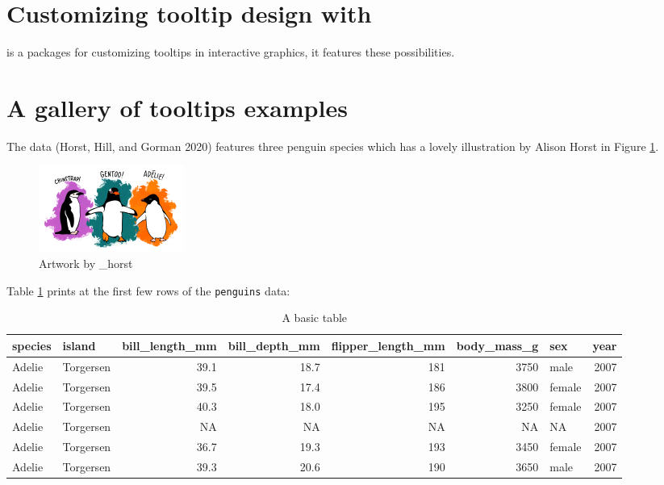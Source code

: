 \section{\texorpdfstring{Customizing tooltip design with }{Customizing tooltip design with }}\label{customizing-tooltip-design-with}

 is a packages for customizing tooltips in interactive graphics, it features these possibilities.

\section{A gallery of tooltips examples}\label{a-gallery-of-tooltips-examples}

The  data (Horst, Hill, and Gorman 2020) features three penguin species which has a lovely illustration by Alison Horst in Figure \ref{fig:penguins-alison}.

\begin{figure}
\includegraphics[width=1\linewidth,height=0.3\textheight]{figures/penguins} \caption{Artwork by \@allison\_horst}\label{fig:penguins-alison}
\end{figure}

Table \ref{tab:penguins-tab-static} prints at the first few rows of the \texttt{penguins} data:

\begin{table}
\centering
\caption{\label{tab:penguins-tab-static}A basic table}
\centering
\fontsize{7}{9}\selectfont
\begin{tabular}[t]{l|l|r|r|r|r|l|r}
\hline
species & island & bill\_length\_mm & bill\_depth\_mm & flipper\_length\_mm & body\_mass\_g & sex & year\\
\hline
Adelie & Torgersen & 39.1 & 18.7 & 181 & 3750 & male & 2007\\
\hline
Adelie & Torgersen & 39.5 & 17.4 & 186 & 3800 & female & 2007\\
\hline
Adelie & Torgersen & 40.3 & 18.0 & 195 & 3250 & female & 2007\\
\hline
Adelie & Torgersen & NA & NA & NA & NA & NA & 2007\\
\hline
Adelie & Torgersen & 36.7 & 19.3 & 193 & 3450 & female & 2007\\
\hline
Adelie & Torgersen & 39.3 & 20.6 & 190 & 3650 & male & 2007\\
\hline
\end{tabular}
\end{table}

